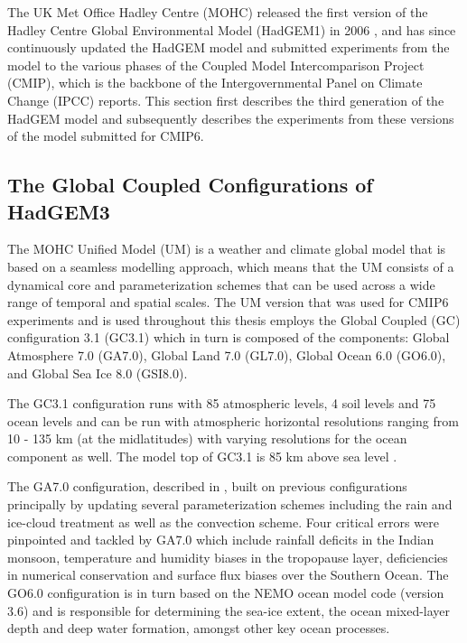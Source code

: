 The UK Met Office Hadley Centre (MOHC) released the first version of the Hadley Centre Global Environmental Model (HadGEM1) in 2006 \citep{johns2006}, and has since continuously updated the HadGEM model and submitted experiments from the model to the various phases of the Coupled Model Intercomparison Project (CMIP), which is the backbone of the Intergovernmental Panel on Climate Change (IPCC) reports. This section first describes the third generation of the HadGEM model and subsequently describes the experiments from these versions of the model submitted for CMIP6.  



\subsection{The Global Coupled Configurations of HadGEM3}

The MOHC Unified Model (UM) is a weather and climate global model that is based on a seamless modelling approach, which means that the UM consists of a dynamical core and parameterization schemes that can be used across a wide range of temporal and spatial scales. 
The UM version that was used for CMIP6 experiments and is used throughout this thesis employs the Global Coupled (GC) configuration 3.1 (GC3.1) \citep{williams2018,walters2019} which in turn is composed of the components: Global Atmosphere 7.0 (GA7.0), Global Land 7.0
(GL7.0), Global Ocean 6.0 (GO6.0), and Global Sea Ice 8.0 (GSI8.0).

The GC3.1 configuration runs with 85 atmospheric levels, 4 soil levels and 75 ocean levels and can be run with atmospheric horizontal resolutions ranging from 10 - 135 km (at the midlatitudes) with varying resolutions for the ocean component as well. The model top of GC3.1 is 85 km above sea level \citep{walters2019}. 

The GA7.0 configuration, described in \cite{walters2019}, built on previous configurations principally by updating several parameterization schemes including the rain and ice-cloud treatment as well as the convection scheme. Four critical errors were pinpointed and tackled by GA7.0 which include rainfall deficits in the Indian monsoon, temperature and humidity biases in the tropopause layer, deficiencies in numerical conservation and surface flux biases over the Southern Ocean. The GO6.0 configuration \citep{storkey2018} is in turn based on the NEMO ocean model code (version 3.6) and is responsible for determining the sea-ice extent, the ocean mixed-layer depth and deep water formation, amongst other key ocean processes.


